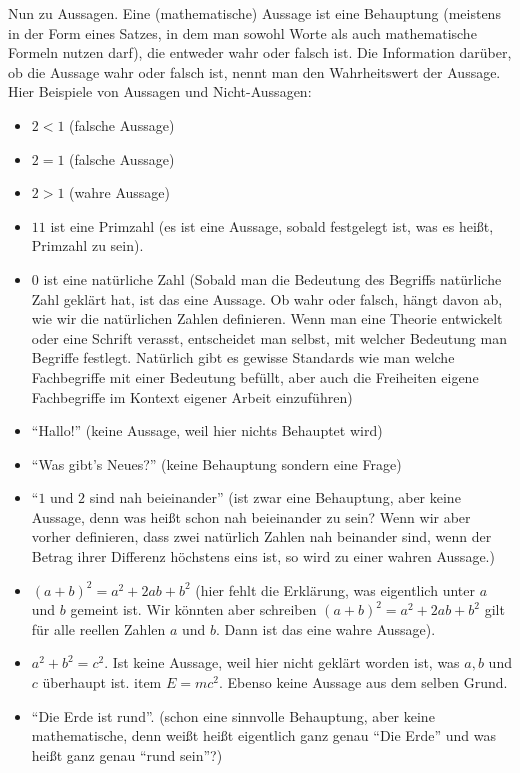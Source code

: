 Nun zu Aussagen. Eine (mathematische) Aussage ist eine Behauptung (meistens in der Form eines Satzes, in dem man sowohl Worte als auch mathematische Formeln nutzen darf), die  entweder wahr oder falsch ist. Die Information darüber, ob die Aussage wahr oder falsch ist, nennt man den Wahrheitswert der Aussage. 
Hier Beispiele von Aussagen und Nicht-Aussagen: 
\begin{itemize}
	\item $ 2 < 1 $ (falsche Aussage)
	\item $ 2 = 1 $ (falsche Aussage)
	\item $ 2 > 1 $ (wahre Aussage)
	\item $11$ ist eine Primzahl (es ist eine Aussage, sobald festgelegt ist, was es heißt, Primzahl zu sein). 
	\item $0$ ist eine natürliche Zahl (Sobald man die Bedeutung des Begriffs natürliche Zahl geklärt hat, ist das eine Aussage. Ob wahr oder falsch, hängt davon ab, wie wir die natürlichen Zahlen definieren. Wenn man eine Theorie entwickelt oder eine Schrift verasst, entscheidet man selbst, mit welcher Bedeutung man Begriffe festlegt. Natürlich gibt es gewisse Standards wie man welche Fachbegriffe mit einer Bedeutung befüllt, aber auch die Freiheiten eigene Fachbegriffe im Kontext eigener Arbeit einzuführen)
	\item ``Hallo!'' (keine Aussage, weil hier nichts Behauptet wird)
	\item ``Was gibt's Neues?'' (keine Behauptung sondern eine Frage)
	\item ``$1$ und $2$ sind nah beieinander'' (ist zwar eine Behauptung, aber keine Aussage, denn was heißt schon nah beieinander zu sein? Wenn wir aber vorher definieren, dass zwei natürlich Zahlen nah beinander sind, wenn der Betrag ihrer Differenz höchstens eins ist, so wird zu einer wahren Aussage.)
	\item $(a+b)^2 = a^2 + 2 a b + b^2$ (hier fehlt die Erklärung, was eigentlich unter $a$ und $b$ gemeint ist. Wir könnten aber schreiben $(a+b)^2 = a^2 + 2 a b + b^2$ gilt für alle reellen Zahlen $a$ und $b$. Dann ist das eine wahre Aussage).
	\item $a^2 + b^2 =c^2$.  Ist keine Aussage, weil hier nicht geklärt worden ist, was $a, b $ und $c$ überhaupt ist. 
	item $E= m c^2$. Ebenso keine Aussage aus dem selben Grund. 
	\item ``Die Erde ist rund''. (schon eine sinnvolle Behauptung, aber keine mathematische, denn  weißt heißt eigentlich ganz genau ``Die Erde'' und was heißt ganz genau ``rund sein''?) 
\end{itemize}

